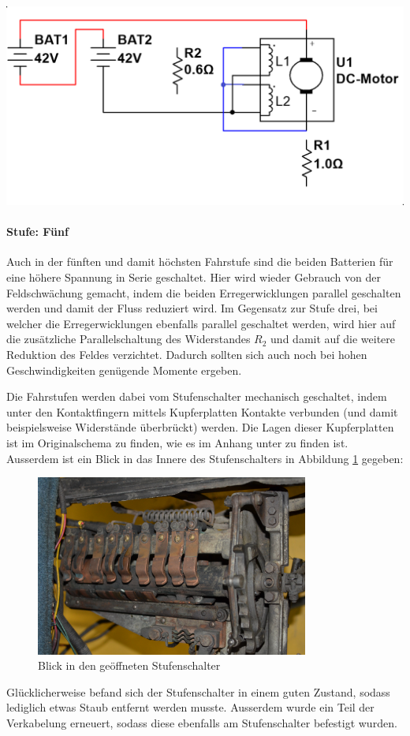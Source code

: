 \begin{minipage}{0.49\textwidth}
	\includegraphics[width=\columnwidth]{images/Stufenschalter/Stufe_5.png}%
\end{minipage}
\begin{minipage}{0.5\textwidth}
	\paragraph{Stufe: Fünf}
	Auch in der fünften und damit höchsten Fahrstufe sind die beiden Batterien für eine höhere Spannung in Serie geschaltet. Hier wird wieder Gebrauch von der Feldschwächung gemacht, indem die beiden Erregerwicklungen parallel geschalten werden und damit der Fluss reduziert wird. Im Gegensatz zur Stufe drei, bei welcher die Erregerwicklungen ebenfalls parallel geschaltet werden, wird hier auf die zusätzliche Parallelschaltung des Widerstandes $R_2$ und damit auf die weitere Reduktion des Feldes verzichtet. Dadurch sollten sich auch noch bei hohen Geschwindigkeiten genügende Momente ergeben.
\end{minipage}

Die Fahrstufen werden dabei vom Stufenschalter mechanisch geschaltet, indem unter den Kontaktfingern mittels Kupferplatten Kontakte verbunden (und damit beispielsweise Widerstände überbrückt) werden. Die Lagen dieser Kupferplatten ist im Originalschema zu finden, wie es im Anhang unter  zu finden ist. Ausserdem ist ein Blick in das Innere des Stufenschalters in Abbildung \ref{fig:Stufenschalter} gegeben:

\begin{figure}[h]
	\centering
		\includegraphics[width=0.8\textwidth]{images/Stufenschalter/Foto}
	\caption{Blick in den geöffneten Stufenschalter}
	\label{fig:Stufenschalter}
\end{figure}

Glücklicherweise befand sich der Stufenschalter in einem guten Zustand, sodass lediglich etwas Staub entfernt werden musste. Ausserdem wurde ein Teil der Verkabelung erneuert, sodass diese ebenfalls am Stufenschalter befestigt wurden.

\newpage